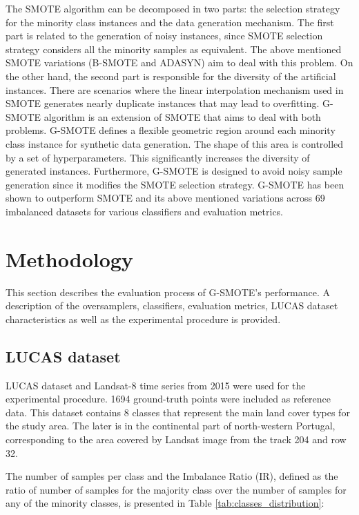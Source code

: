 \documentclass[remotesensing,article,submit,moreauthors,pdftex]{Definitions/mdpi}
\begin{document}
The SMOTE algorithm can be decomposed in two parts: the selection strategy for
the minority class instances and the data generation mechanism. The first part
is related to the generation of noisy instances, since SMOTE selection strategy
considers all the minority samples as equivalent. The above mentioned SMOTE
variations (B-SMOTE and ADASYN) aim to deal with this problem. On the other
hand, the second part is responsible for the diversity of the artificial
instances. There are scenarios where the linear interpolation mechanism used in
SMOTE generates nearly duplicate instances that may lead to overfitting. G-SMOTE
algorithm is an extension of SMOTE that aims to deal with both problems. G-SMOTE
defines a flexible geometric region around each minority class instance for
synthetic data generation. The shape of this area is controlled by a set of
hyperparameters. This significantly increases the diversity of generated
instances. Furthermore, G-SMOTE is designed to avoid noisy sample generation
since it modifies the SMOTE selection strategy. G-SMOTE has been shown to
outperform SMOTE and its above mentioned variations across 69 imbalanced
datasets for various classifiers and evaluation metrics.


\section{Methodology}

This section describes the evaluation process of G-SMOTE's performance. A
description of the oversamplers, classifiers, evaluation metrics, LUCAS dataset
characteristics as well as the experimental procedure is provided.

\subsection{LUCAS dataset}

LUCAS dataset and Landsat-8 time series from 2015 were used for the experimental
procedure. 1694 ground-truth points were included as reference data. This
dataset contains 8 classes that represent the main land cover types for the
study area. The later is in the continental part of north-western Portugal,
corresponding to the area covered by Landsat image from the track 204 and row
32.

The number of samples per class and the Imbalance Ratio (IR), defined as the ratio of
number of samples for the majority class over the number of samples for any of
the minority classes, is presented in Table \ref{tab:classes_distribution}:
\end{document}
